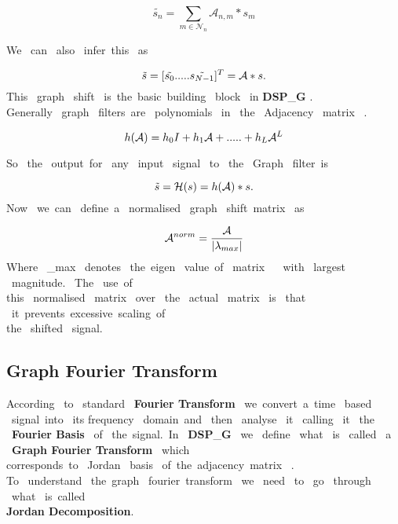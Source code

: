 \documentclass[12pt,onecolumn]{article}
\begin{document}
    \begin{equation*}
        \widetilde{s_{n}} = \sum_{m\in\mathcal{N}_{n}} \mathcal{A}_{n,m} *s_{m}  
    \end{equation*}

We \ can \ also \ infer\ this \ as\ 

    \begin{equation*}
        \tilde{s} = [\tilde{s_{0}} ..... \tilde{s_{N-1}}]^T = \mathcal{A}*s. \\
    \end{equation*}
 This \ graph \ shift \ is\ the\ basic\ building \ block \ in   {{\textbf{DSP}}_{\bf{G}}} .\\ 
Generally \ graph \ filters\ are \ polynomials \ in \ the \ Adjacency \ matrix \ .

\begin{equation*}
        h(\mathcal{A}) = h_{0}I + h_{1}\mathcal{A} + ..... + h_{L}\mathcal{A}^{L} \\ 
\end{equation*}

So \ the \ output\ for \ any \ input \ signal \ to \ the \ Graph \ filter\ is 

\begin{equation*}
    \tilde{s} = \mathcal{H}(s) = h(\mathcal{A})*s. \\
\end{equation*}
Now \ we\ can \ define\ a \ normalised \ graph \ shift\ matrix  \ as

\begin{equation*}
    \mathcal{A}^{norm} = \frac{\mathcal{A}}{|\lambda_{max}|}\\
\end{equation*}
Where \ \lambda_{max}  \ denotes \ the\ eigen \ value\ of \ matrix \  \ with \ largest \ magnitude. \ The \ use\ of\\ this \ normalised \ matrix \ over \ the \ actual \ matrix \ is \ that \ it\ prevents\ excessive\ scaling\ of \\ the \ shifted \ signal. \\ 

\subsection{{\textbf{Graph Fourier Transform}}}
According \ to \ standard \ \textbf{Fourier Transform} \ we\ convert\ a\ time \ based \ signal\ into \ its frequency \ domain\ and \ then \ analyse \ it  \ calling \ it \ the \ \textbf{Fourier Basis} \ of \ the\ signal.\ In \ {{\textbf{DSP}}_{\bf{G}}} \ we \ define \ what \ is \ called \ a \ \textbf{Graph Fourier Transform} \ which \\ corresponds\ to \ Jordan \ basis \ of\ the\ adjacency\ matrix \ . \\ To \ understand \ the\ graph \ fourier\ transform \ we \ need \ to  \ go \ through \ what \  is\ called \\ \textbf{Jordan Decomposition}. \\  
\end{document}
